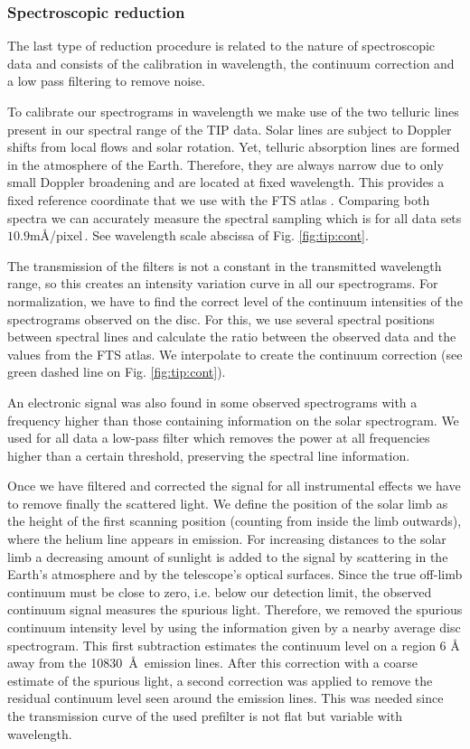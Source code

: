 \subsubsection*{Spectroscopic reduction}

The last type of reduction procedure is related to the nature of spectroscopic data and consists of the calibration in wavelength, the continuum correction and a low pass filtering to remove noise.

To calibrate our spectrograms in wavelength we make use of the two telluric lines present in our spectral range of the TIP data. Solar lines are subject to Doppler shifts from local flows and solar rotation. Yet, telluric absorption lines are formed in the atmosphere of the Earth. Therefore, they are always narrow due to only small Doppler broadening and are located at fixed wavelength. This provides a fixed reference coordinate that we use with the FTS atlas \citep{Neckel:1999lr}. Comparing both spectra we can accurately measure the spectral sampling which is for all data sets $10.9 $m\AA/pixel\,. See wavelength scale abscissa of Fig. \ref{fig:tip:cont}.

The transmission of the filters is not a constant in the transmitted wavelength range, so this creates an intensity variation curve in all our spectrograms. For normalization, we have to find the correct level of the continuum intensities of the spectrograms observed on the disc. For this, we use several spectral positions between spectral lines and calculate the ratio between the observed data and the values from the  FTS atlas. We interpolate to create the continuum correction (see green dashed line on Fig. \ref{fig:tip:cont}).

An electronic signal was also found in some observed spectrograms with a frequency higher than those containing information on the solar spectrogram. We used for all data a low-pass filter which removes the power at all frequencies higher than a certain threshold, preserving the spectral line information.

Once we have filtered and corrected the signal for all instrumental effects we have to remove finally the scattered light.  We define the position of the solar limb as the height of the first scanning position (counting from inside the limb outwards), where the helium line appears in emission. For increasing distances to the solar limb a decreasing amount of sunlight is added to the signal by scattering in the Earth's atmosphere and by the telescope's optical surfaces. Since the true off-limb continuum must be close to zero, i.e. below our detection limit, the observed continuum signal measures the spurious light.  Therefore, we removed the spurious continuum intensity level by using the information given by a nearby average disc spectrogram. This first subtraction estimates the continuum level on a region 6 \AA \, away from the   10830~\AA \, emission lines.  After this correction with a coarse estimate of the spurious light, a second correction was applied to remove the residual continuum level 
seen around the emission lines. This was needed since the transmission 
curve of the used prefilter is not flat but variable with wavelength.

